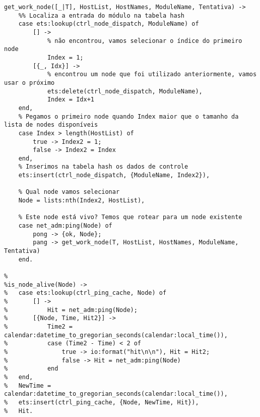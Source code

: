 \begin{lstlisting}
get_work_node([_|T], HostList, HostNames, ModuleName, Tentativa) -> 
	%% Localiza a entrada do módulo na tabela hash
	case ets:lookup(ctrl_node_dispatch, ModuleName) of
		[] -> 
			% não encontrou, vamos selecionar o índice do primeiro node
			Index = 1;
		[{_, Idx}] -> 
			% encontrou um node que foi utilizado anteriormente, vamos usar o próximo
			ets:delete(ctrl_node_dispatch, ModuleName),
			Index = Idx+1
	end,
	% Pegamos o primeiro node quando Index maior que o tamanho da lista de nodes disponíveis
	case Index > length(HostList) of
		true -> Index2 = 1;
		false -> Index2 = Index
	end,
	% Inserimos na tabela hash os dados de controle
	ets:insert(ctrl_node_dispatch, {ModuleName, Index2}),

	% Qual node vamos selecionar
	Node = lists:nth(Index2, HostList),
	
	% Este node está vivo? Temos que rotear para um node existente
	case net_adm:ping(Node) of
		pong -> {ok, Node};
		pang -> get_work_node(T, HostList, HostNames, ModuleName, Tentativa)
	end.
		
%	
%is_node_alive(Node) -> 
%	case ets:lookup(ctrl_ping_cache, Node) of		
%		[] -> 		
%			Hit = net_adm:ping(Node);
%		[{Node, Time, Hit2}] -> 		
%			Time2 = calendar:datetime_to_gregorian_seconds(calendar:local_time()),			
%			case (Time2 - Time) < 2 of		
%				true -> io:format("hit\n\n"), Hit = Hit2;
%				false -> Hit = net_adm:ping(Node)
%			end		
%	end,		
%	NewTime = calendar:datetime_to_gregorian_seconds(calendar:local_time()),		
%	ets:insert(ctrl_ping_cache, {Node, NewTime, Hit}),
%	Hit.
	


\end{lstlisting}
